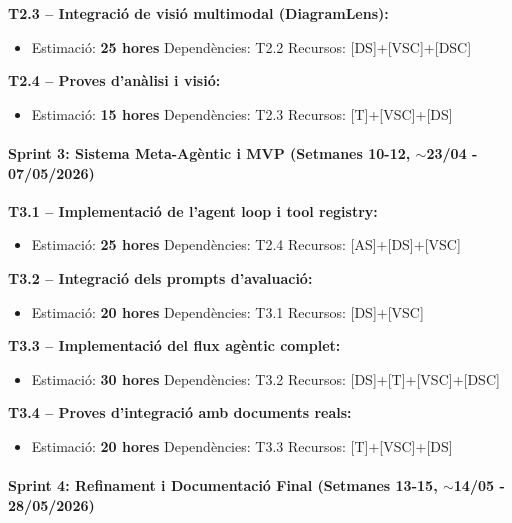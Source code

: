 \documentclass[12pt,a4paper,twoside]{report}
\begin{document}
\textbf{T2.3 -- Integraci\'o de visi\'o multimodal (DiagramLens):}
\begin{itemize}
    \item Estimaci\'o: \textbf{25 hores} \quad Depend\`encies: T2.2 \quad Recursos: [DS]+[VSC]+[DSC]
\end{itemize}

\textbf{T2.4 -- Proves d'an\`alisi i visi\'o:}
\begin{itemize}
    \item Estimaci\'o: \textbf{15 hores} \quad Depend\`encies: T2.3 \quad Recursos: [T]+[VSC]+[DS]
\end{itemize}

\paragraph{Sprint 3: Sistema Meta-Ag\`entic i MVP (Setmanes 10-12, $\sim$23/04 - 07/05/2026)}

\textbf{T3.1 -- Implementaci\'o de l'agent loop i tool registry:}
\begin{itemize}
    \item Estimaci\'o: \textbf{25 hores} \quad Depend\`encies: T2.4 \quad Recursos: [AS]+[DS]+[VSC]
\end{itemize}

\textbf{T3.2 -- Integraci\'o dels prompts d'avaluaci\'o:}
\begin{itemize}
    \item Estimaci\'o: \textbf{20 hores} \quad Depend\`encies: T3.1 \quad Recursos: [DS]+[VSC]
\end{itemize}

\textbf{T3.3 -- Implementaci\'o del flux ag\`entic complet:}
\begin{itemize}
    \item Estimaci\'o: \textbf{30 hores} \quad Depend\`encies: T3.2 \quad Recursos: [DS]+[T]+[VSC]+[DSC]
\end{itemize}

\textbf{T3.4 -- Proves d'integraci\'o amb documents reals:}
\begin{itemize}
    \item Estimaci\'o: \textbf{20 hores} \quad Depend\`encies: T3.3 \quad Recursos: [T]+[VSC]+[DS]
\end{itemize}

\paragraph{Sprint 4: Refinament i Documentaci\'o Final (Setmanes 13-15, $\sim$14/05 - 28/05/2026)}
\end{document}
